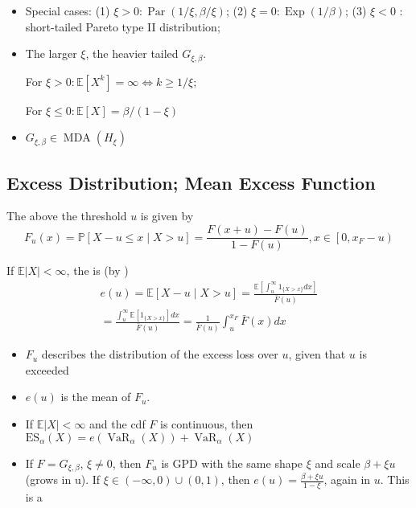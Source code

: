 \begin{itemize}[leftmargin=*]
    \item Special cases:
(1) $\xi>0: \operatorname{Par}(1 / \xi, \beta / \xi)$;
(2) $\xi=0: \operatorname{Exp}(1 / \beta)$;
(3) $\xi<0$ : short-tailed Pareto type II distribution;


 \item The larger $\xi$, the heavier tailed $G_{\xi, \beta}$. 
 
 For $\xi>0: \mathbb{E}\left[X^{k}\right]=\infty \Leftrightarrow k \geq 1 / \xi$; 
 
 For $\xi \leq 0: \mathbb{E}[X]=\beta /(1-\xi)$
 
 \item $G_{\xi, \beta} \in \operatorname{MDA}\left(H_{\xi}\right)$
\end{itemize}





\subsection*{Excess Distribution; Mean Excess Function}
The  above the threshold $u$ is given by
$$
F_{u}(x)=\mathbb{P}[X-u \leq x \mid X>u]=\frac{F(x+u)-F(u)}{1-F(u)}, x \in\left[0, x_{F}-u\right)
$$

If $\mathbb{E}|X|<\infty$, the  is (by )
$$
\begin{aligned}
e(u)=\mathbb{E}[X-u \mid X>u]=\frac{\mathbb{E}\left[\int_{u}^{\infty} 1_{\{X>x\}} d x\right]}{\bar{F}(u)} \\
=\frac{\int_{u}^{\infty} \mathbb{E}\left[1_{\{X>x\}}\right] d x}{\bar{F}(u)}=\frac{1}{\bar{F}(u)} \int_{u}^{x_{F}} \bar{F}(x) d x
\end{aligned}
$$
\begin{itemize}[leftmargin=*]
    \item $F_{u}$ describes the distribution of the excess loss over $u$, given that $u$ is exceeded 
    \item $e(u)$ is the mean of $F_{u}$.
    \item If $\mathbb{E}|X|<\infty$ and the cdf $F$ is continuous, then $\mathrm{ES}_{\alpha}(X)=e\left(\operatorname{VaR}_{\alpha}(X)\right)+\operatorname{VaR}_{\alpha}(X)$
    \item If $F = G_{\xi, \beta}$, $\xi \neq 0$, then $F_{u}$ is GPD with the same shape $\xi$ and scale $\beta+\xi u$ (grows  in u). 
    If $\xi \in(-\infty, 0) \cup(0,1)$, then $e(u)=\frac{\beta+\xi u}{1-\xi}$, again  in $u$. This is a 
\end{itemize}







